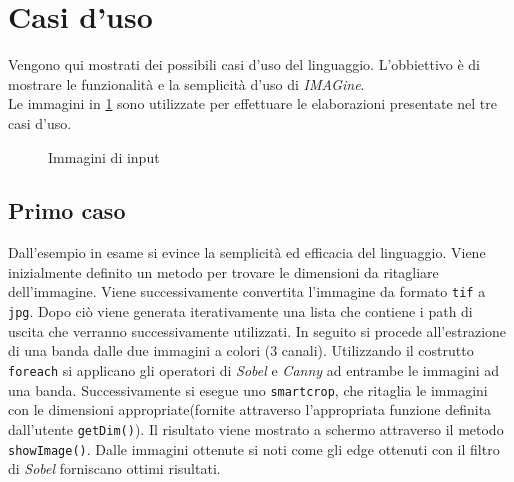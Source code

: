 \documentclass[10pt]{article}
\begin{document}
\section{Casi d'uso}
Vengono qui mostrati dei possibili casi d'uso del linguaggio. L'obbiettivo è di mostrare le funzionalità e la semplicità d'uso di \textit{IMAGine}.\\
Le immagini in \ref{fig:input.png} sono utilizzate per effettuare le elaborazioni presentate nel tre casi d'uso.

\begin{figure}[H]
	\centering
	\caption{Immagini di input}
	\label{fig:input.png}
\end{figure}
\clearpage
\subsection{Primo caso}
Dall'esempio in esame si evince la semplicità ed efficacia del linguaggio.
Viene inizialmente definito un metodo per trovare le dimensioni da ritagliare dell'immagine. Viene successivamente convertita l'immagine da formato \texttt{tif} a \texttt{jpg}. Dopo ciò viene generata iterativamente una lista che contiene i path di uscita che verranno successivamente utilizzati. In seguito si procede all'estrazione di una banda dalle due immagini a colori (3 canali). Utilizzando il costrutto \texttt{foreach} si applicano gli operatori di \textit{Sobel} e \textit{Canny} ad entrambe le immagini ad una banda. Successivamente si esegue uno \texttt{smartcrop}, che ritaglia le immagini con le dimensioni appropriate(fornite attraverso l'appropriata funzione definita dall'utente \texttt{getDim()}). Il risultato viene mostrato a schermo attraverso il metodo \texttt{showImage()}. Dalle immagini ottenute si noti come gli edge ottenuti con il filtro di \textit{Sobel} forniscano ottimi risultati.

\end{document}
